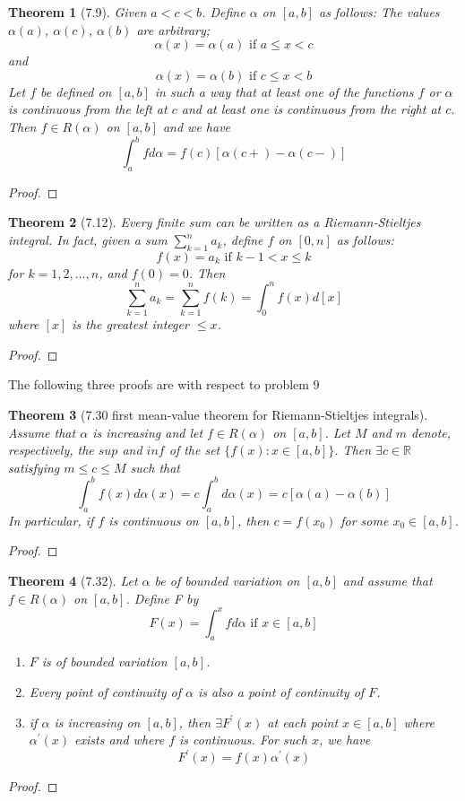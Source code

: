 \documentclass[aps,pra,notitlepage,amsmath,amssymb,letterpaper,12pt]{revtex4-1}
\newtheorem{theorem}{Theorem}
\begin{document}
\begin{theorem}[7.9]
Given $a < c < b$. Define $\alpha$ on $[a,b]$ as follows: The values $\alpha(a)$, $\alpha(c)$, $\alpha(b)$ are arbitrary;
\[\alpha(x) = \alpha(a) \textrm{ if } a \leq x < c\]
and
\[\alpha(x) = \alpha(b) \textrm{ if } c \leq x < b\]
Let $f$ be defined on $[a,b]$ in such a way that at least one of the functions $f$ or $\alpha$ is continuous from the left at $c$ and at least one is continuous from the right at $c$. Then $f \in R(\alpha)$ on $[a,b]$ and we have
\[\int_{a}^{b} f d\alpha = f(c)[\alpha(c+) - \alpha(c-)]\]
\end{theorem}
\begin{proof}
\end{proof}

\begin{theorem}[7.12]
Every finite sum can be written as a Riemann-Stieltjes integral. In fact, given a sum $\sum_{k=1}^{n} a_{k}$, define $f$ on $[0,n]$ as follows:
\[f(x) = a_{k}  \textrm{  if  }  k-1 < x \leq k\]
for $k=1,2,...,n$, and $f(0) = 0$. Then
\[\sum_{k=1}^{n}a_{k} = \sum_{k=1}^{n}f(k) = \int_{0}^{n}f(x)d[x]\]
where $[x]$ is the greatest integer $\leq x$.
\end{theorem}
\begin{proof}
\end{proof}

The following three proofs are with respect to problem 9
\begin{theorem}[7.30 first mean-value theorem for Riemann-Stieltjes integrals]
Assume that $\alpha$ is increasing and let $f \in R(\alpha)$ on $[a,b]$. Let $M$ and $m$ denote, respectively, the $sup$ and $inf$ of the set $\{f(x):x \in [a,b]\}$. Then $\exists c \in \mathbb{R}$ satisfying $m \leq c \leq M$ such that
\[\int_{a}^{b}f(x)d\alpha(x) = c\int_{a}^{b}d\alpha(x) = c[\alpha(a)-\alpha(b)]\]
In particular, if $f$ is continuous on $[a,b]$, then $c=f(x_{0})$ for some $x_{0} \in [a,b]$.
\end{theorem}
\begin{proof}
\end{proof}

\begin{theorem}[7.32]
Let $\alpha$ be of bounded variation on $[a,b]$ and assume that
$f \in R(\alpha)$ on $[a,b]$. Define F by
\[F(x)=\int_{a}^{x} f d \alpha \textrm{ if } x \in [a,b]\]
\begin{enumerate}[\upshape a)]
  \item $F$ is of bounded variation $[a,b]$.
  \item Every point of continuity of $\alpha$ is also a point of continuity of $F$.
  \item if $\alpha$ is increasing on $[a,b]$, then $\exists F^\prime(x)$ at each point $x \in [a,b]$ where $\alpha^\prime(x)$ exists and where $f$ is continuous. For such $x$, we have $$F^\prime(x) = f(x)\alpha^\prime(x)$$
\end{enumerate}
\end{theorem}
\begin{proof}
\end{proof}
\end{document}
